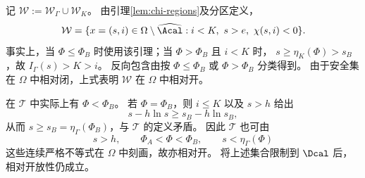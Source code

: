 \begin{remark}[控制分区的相对开放性]
\label{rem:relative-open-control-regions}
记 $\mathcal W:=\mathcal W_\Gamma\cup\mathcal W_K$。
由引理\ref{lem:chi-regions}及分区定义，
\[
\mathcal W
=\{x=(s,i)\in\Omega\setminus\widehat{\Acal}:
  i<K,\ s>e,\ \chi(s,i)<0\}.
\]
事实上，当 $\Phi\le\Phi_B$ 时使用该引理；当 $\Phi>\Phi_B$ 且 $i<K$ 时，
$s\ge\eta_K(\Phi)>s_B$，故 $I_\Gamma(s)>K>i$。
反向包含由按 $\Phi\le\Phi_B$ 或 $\Phi>\Phi_B$ 分类得到。
由于安全集在 $\Omega$ 中相对闭，上式表明 $\mathcal W$ 在 $\Omega$ 中相对开。

在 $\mathcal T$ 中实际上有 $\Phi<\Phi_B$。
若 $\Phi=\Phi_B$，则 $i\le K$ 以及 $s>h$ 给出
\[
s-h\ln s\ge s_B-h\ln s_B,
\]
从而 $s\ge s_B=\eta_\Gamma(\Phi_B)$，与 $\mathcal T$ 的定义矛盾。
因此 $\mathcal T$ 也可由
\[
s>h,\qquad \Phi_A<\Phi<\Phi_B,\qquad
s<\eta_\Gamma(\Phi)
\]
这些连续严格不等式在 $\Omega$ 中刻画，故亦相对开。
将上述集合限制到 $\Dcal$ 后，相对开放性仍成立。
\end{remark}
